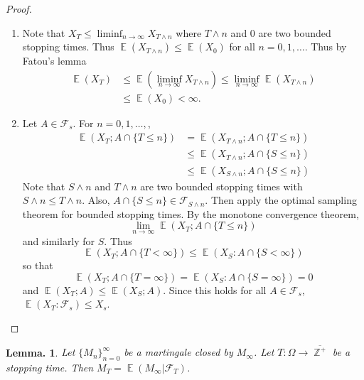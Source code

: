 \documentclass[11pt, a4paper]{memoir}
\DeclareMathOperator{\Z}{{\mathbb{Z}}}
\theoremstyle{change}
\newtheorem{lemma}[theorem]{Lemma.}
\theoremstyle{plain}
\theoremstyle{nonumberplain}
\newtheorem{proof}{Proof}
\DeclareMathOperator{\E}{{\mathbb{E}}}
\numberwithin{equation}{section}
\begin{document}
\begin{proof}
    \begin{enumerate}[nl]
        \item Note that $X_T\leq\liminf_{n\to\infty}X_{T\wedge n}$ where $T\wedge n$ and $0$ are two bounded stopping times.
            Thus $\E(X_{T\wedge n})\leq\E(X_0)$ for all $n=0,1,\ldots$.
            Thus by Fatou's lemma
            \begin{align*}
                \E(X_T)&\leq\E(\liminf_{n\to\infty} X_{T\wedge n})\leq\liminf_{n\to\infty}\E(X_{T\wedge n})\\
                       &\leq\E(X_0)<\infty.
            \end{align*}
        \item Let $A\in\mathcal{F}_s$.
            For $n=0,1,\ldots,$,
            \begin{align*}
                \E(X_T;A\cap\{T\leq n\}) &= \E(X_{T\wedge n};A\cap\{T\leq n\})\\
                                         &\leq \E(X_{T\wedge n};A\cap\{S\leq n\})\\
                                         &\leq \E(X_{S\wedge n}; A\cap\{S\leq n\})
            \end{align*}
            Note that $S\wedge n$ and $T\wedge n$ are two bounded stopping times with $S\wedge n\leq T\wedge n$.
            Also, $A\cap\{S\leq n\}\in\mathcal{F}_{S\wedge n}$.
            Then apply the optimal sampling theorem for bounded stopping times.
            By the monotone convergence theorem,
            \begin{equation*}
                \lim_{n\to\infty}\E(X_T;A\cap\{T\leq n\})
            \end{equation*}
            and similarly for $S$.
            Thus
            \begin{equation*}
                \E(X_T;A\cap\{T<\infty\})\leq\E(X_S:A\cap\{S<\infty\})
            \end{equation*}
            so that
            \begin{equation*}
                \E(X_T;A\cap\{T=\infty\})=\E(X_S:A\cap\{S=\infty\})=0
            \end{equation*}
            and $\E(X_T;A)\leq\E(X_S;A)$.
            Since this holds for all $A\in\mathcal{F}_s$, $\E(X_T:\mathcal{F}_s)\leq X_s$.
    \end{enumerate}
\end{proof}
\begin{lemma}
    Let $\{M_n\}_{n=0}^\infty$ be a martingale closed by $M_\infty$.
    Let $T:\Omega\to\overline{\Z^+}$ be a stopping time.
    Then $M_T=\E(M_\infty|\mathcal{F}_T)$.
\end{lemma}
\end{document}
